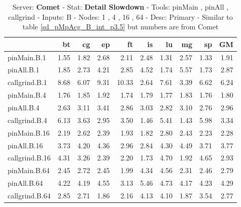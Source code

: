 \begin{table*}[]
\caption{Server: \textbf{Comet} - 
 Stat: \textbf{Detail Slowdown} -
 Tools: pinMain , pinAll , callgrind - 
 Inputs: B - 
 Nodes: 1 , 4 , 16 , 64 - 
 Desc: Primary - Similar to table \ref{sd_pMpAcg_B_int_p3.5} but numbers are from Comet}
\label{comet_sd_pMpAcg_B_int_p3.5}\begin{center}
\begin{tabular}{|l|rrrrrrrr|r|}
\hline
                &   bt &   cg &   ep &    ft &   is &   lu &   mg &   sp &   GM \\
\hline
 pinMain.B.1    & 1.55 & 1.82 & 2.68 &  2.11 & 2.48 & 1.31 & 2.57 & 1.33 & 1.91 \\
 pinAll.B.1     & 1.85 & 2.73 & 4.21 &  2.85 & 4.52 & 1.74 & 5.57 & 1.73 & 2.87 \\
 callgrind.B.1  & 8.68 & 6.07 & 9.31 & 10.33 & 2.64 & 7.61 & 3.39 & 6.62 & 6.24 \\
  \hline
 pinMain.B.4    & 1.76 & 1.85 & 1.92 &  1.74 & 1.79 & 1.77 & 1.83 & 1.76 & 1.80 \\
 pinAll.B.4     & 2.63 & 3.11 & 3.41 &  2.86 & 3.03 & 2.82 & 3.10 & 2.76 & 2.96 \\
 callgrind.B.4  & 6.13 & 3.63 & 2.95 &  3.50 & 1.46 & 5.41 & 1.43 & 5.98 & 3.34 \\
  \hline
 pinMain.B.16   & 2.19 & 2.62 & 2.39 &  1.93 & 1.82 & 2.80 & 2.43 & 2.23 & 2.28 \\
 pinAll.B.16    & 3.73 & 4.20 & 4.36 &  2.96 & 2.84 & 4.30 & 4.49 & 3.71 & 3.77 \\
 callgrind.B.16 & 4.31 & 3.26 & 2.39 &  2.20 & 1.73 & 4.70 & 1.92 & 4.65 & 2.93 \\
 \hline
 pinMain.B.64   & 2.45 & 2.72 & 2.45 &  1.99 & 4.34 & 4.56 & 2.31 & 2.46 & 2.79 \\
 pinAll.B.64    & 4.22 & 4.19 & 4.55 &  3.13 & 5.46 & 4.73 & 4.17 & 4.23 & 4.29 \\
 callgrind.B.64 & 2.85 & 2.71 & 1.86 &  2.16 & 4.13 & 4.10 & 1.87 & 3.54 & 2.77 \\
\hline
\end{tabular}
\end{center}
\end{table*}
